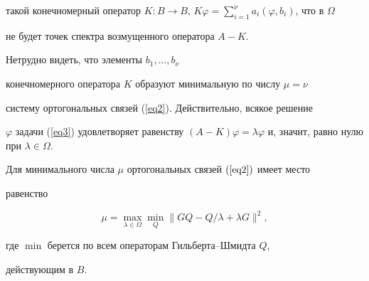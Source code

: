 такой конечномерный оператор $K:B\to B$, $K\varphi=


\sum\limits_{i=1}^\nu a_i(\varphi,b_i)$, что в $\Omega$


не будет точек спектра  возмущенного оператора $A-K$. 





Нетрудно видеть, что элементы $b_1,\dotsc,b_\nu$


конечномерного оператора $K$ образуют минимальную по числу $\mu=\nu$


систему ортогональных связей (\ref{eq2}). Действительно, всякое решение


$\varphi$ задачи (\ref{eq3}) удовлетворяет равенству $(A-K)\varphi=


\lambda\varphi$ и, значит, равно нулю при $\lambda\in\Omega$.





\begin{thm}


Для минимального числа $\mu$ ортогональных связей $(\ref{eq2})$ имеет место


равенство


\begin{equation}\label{eq5}


\mu=\max_{\lambda\in\Omega}\min_Q\|GQ-Q/\lambda+\lambda G\|^2,


\end{equation}


где $\min$ берется по всем операторам Гильберта--Шмидта $Q$, 


действующим в $B$.


\end{thm}





